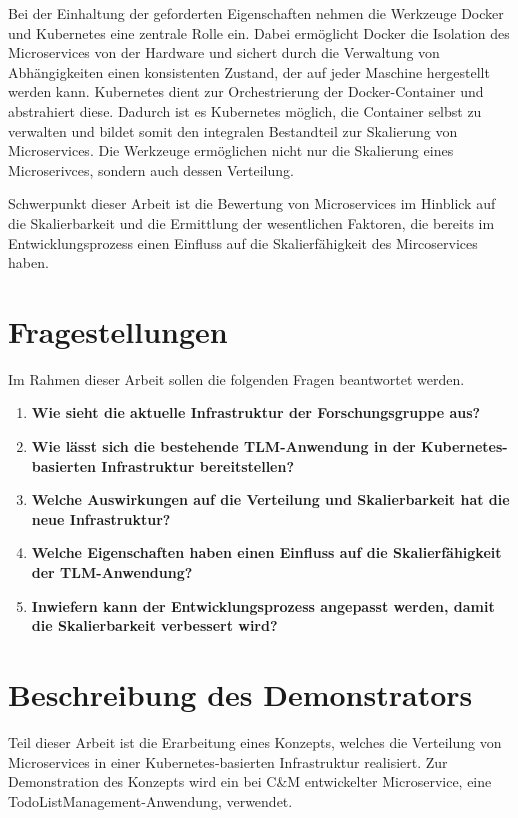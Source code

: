 Bei der Einhaltung der geforderten Eigenschaften nehmen die Werkzeuge Docker und Kubernetes eine zentrale Rolle ein.
Dabei ermöglicht Docker die Isolation des Microservices von der Hardware und sichert durch die Verwaltung von Abhängigkeiten einen konsistenten Zustand, der auf jeder Maschine hergestellt werden kann. 
Kubernetes dient zur Orchestrierung der Docker-Container und abstrahiert diese.
Dadurch ist es Kubernetes möglich, die Container selbst zu verwalten und bildet somit den integralen Bestandteil zur Skalierung von Microservices.
Die Werkzeuge ermöglichen nicht nur die Skalierung eines Microserivces, sondern auch dessen Verteilung.

Schwerpunkt dieser Arbeit ist die Bewertung von Microservices im Hinblick auf die Skalierbarkeit und die Ermittlung der wesentlichen Faktoren, die bereits im Entwicklungsprozess einen Einfluss auf die Skalierfähigkeit des Mircoservices haben.

\section{Fragestellungen}

Im Rahmen dieser Arbeit sollen die folgenden Fragen beantwortet werden.

\begin{enumerate}
	\item \textbf{Wie sieht die aktuelle Infrastruktur der Forschungsgruppe aus?}
    \item \textbf{Wie lässt sich die bestehende TLM-Anwendung in der Kubernetes-basierten Infrastruktur bereitstellen?}
	\item \textbf{Welche Auswirkungen auf die Verteilung und Skalierbarkeit hat die neue Infrastruktur?}
	\item \textbf{Welche Eigenschaften haben einen Einfluss auf die Skalierfähigkeit der TLM-Anwendung?}
	\item \textbf{Inwiefern kann der Entwicklungsprozess angepasst werden, damit die Skalierbarkeit verbessert wird?}
\end{enumerate}

\section{Beschreibung des Demonstrators}

Teil dieser Arbeit ist die Erarbeitung eines Konzepts, welches die Verteilung von Microservices in einer Kubernetes-basierten Infrastruktur realisiert.
Zur Demonstration des Konzepts wird ein bei C\&M entwickelter Microservice, eine TodoListManagement-Anwendung, verwendet.

